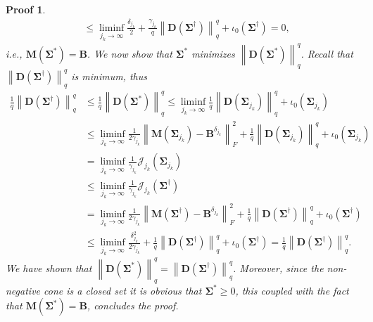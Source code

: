 \documentclass[final,leqno]{siamltex}
\newtheorem{prf}[theorem]{Proof}
\newcommand{\norm}[1]{\left\| #1 \right\|}
\newcommand{\Sigmab}{\mathbf{\Sigma}}
\begin{document}
\begin{prf}
\begin{align*}
	&\leq\liminf_{j_k\rightarrow\infty}\frac{\delta_{j_k}}{2}+\frac{\gamma_{j_k}}{q}\norm{\mathbf{D}(\mathbf{\Sigma}^\dagger)}_q^q+\iota_0(\Sigmab^\dagger)=0,\nonumber
	\end{align*} 
	i.e., $\mathbf{M}(\Sigmab^*)=\mathbf{B}$. We now show that $\Sigmab^*$ minimizes $\norm{\mathbf{D}(\mathbf{\Sigma}^*)}_q^q$. Recall that $\norm{\mathbf{D}(\mathbf{\Sigma}^\dagger)}_q^q$ is minimum, thus
	\begin{align*}
	\frac{1}{q}\norm{\mathbf{D}(\mathbf{\Sigma}^\dagger)}_q^q&\leq \frac{1}{q}\norm{\mathbf{D}(\mathbf{\Sigma}^*)}_q^q\leq\liminf_{j_k\rightarrow\infty}\frac{1}{q}\norm{\mathbf{D}(\mathbf{\Sigma}_{j_k})}_q^q+\iota_0(\Sigmab_{j_k})\nonumber\\
	&\leq\liminf_{j_k\rightarrow\infty}\frac{1}{2\gamma_{j_k}}\norm{\mathbf{M}(\Sigmab_{j_k})-\mathbf{B}^{\delta_{j_k}}}_F^2+\frac{1}{q}\norm{\mathbf{D}(\mathbf{\Sigma}_{j_k})}_q^q+\iota_0(\Sigmab_{j_k})\nonumber\\
	&=\liminf_{j_k\rightarrow\infty}\frac{1}{\gamma_{j_k}}\mathcal{J}_{j_k}(\Sigmab_{j_k})\\
	&\leq\liminf_{j_k\rightarrow\infty}\frac{1}{\gamma_{j_k}}\mathcal{J}_{j_k}(\Sigmab^\dagger)\nonumber\\
	&=\liminf_{j_k\rightarrow\infty}\frac{1}{2\gamma_{j_k}}\norm{\mathbf{M}(\Sigmab^\dagger)-\mathbf{B}^{\delta_{j_k}}}_F^2+\frac{1}{q}\norm{\mathbf{D}(\mathbf{\Sigma}^\dagger)}_q^q+\iota_0(\Sigmab^\dagger)\nonumber\\
	&\leq\liminf_{j_k\rightarrow\infty}\frac{\delta_{j_k}^2}{2\gamma_{j_k}}+\frac{1}{q}\norm{\mathbf{D}(\mathbf{\Sigma}^\dagger)}_q^q+\iota_0(\Sigmab^\dagger)=\frac{1}{q}\norm{\mathbf{D}(\mathbf{\Sigma}^\dagger)}_q^q.\nonumber
	\end{align*}
	We have shown that $\norm{\mathbf{D}(\mathbf{\Sigma}^*)}_q^q=\norm{\mathbf{D}(\mathbf{\Sigma}^\dagger)}_q^q$. Moreover, since the non-negative cone is a closed set it is obvious that $\Sigmab^*\geq0$, this coupled with the fact that $\mathbf{M}(\Sigmab^*)=\mathbf{B}$, concludes the proof.
\end{prf}
\end{document}
